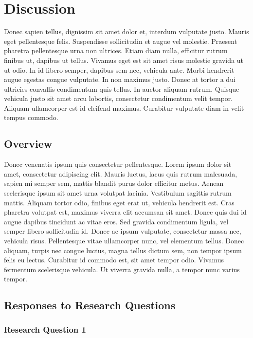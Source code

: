 \section{Discussion}
\label{sec:5}

Donec sapien tellus, dignissim sit amet dolor et, interdum vulputate justo. Mauris eget pellentesque felis. Suspendisse sollicitudin et augue vel molestie. Praesent pharetra pellentesque urna non ultrices. Etiam diam nulla, efficitur rutrum finibus ut, dapibus ut tellus. Vivamus eget est sit amet risus molestie gravida ut ut odio. In id libero semper, dapibus sem nec, vehicula ante. Morbi hendrerit augue egestas congue vulputate. In non maximus justo. Donec at tortor a dui ultricies convallis condimentum quis tellus. In auctor aliquam rutrum. Quisque vehicula justo sit amet arcu lobortis, consectetur condimentum velit tempor. Aliquam ullamcorper est id eleifend maximus. Curabitur vulputate diam in velit tempus commodo.

\subsection{Overview}

Donec venenatis ipsum quis consectetur pellentesque. Lorem ipsum dolor sit amet, consectetur adipiscing elit. Mauris luctus, lacus quis rutrum malesuada, sapien mi semper sem, mattis blandit purus dolor efficitur metus. Aenean scelerisque ipsum sit amet urna volutpat lacinia. Vestibulum sagittis rutrum mattis. Aliquam tortor odio, finibus eget erat ut, vehicula hendrerit est. Cras pharetra volutpat est, maximus viverra elit accumsan sit amet. Donec quis dui id augue dapibus tincidunt ac vitae eros. Sed gravida condimentum ligula, vel semper libero sollicitudin id. Donec ac ipsum vulputate, consectetur massa nec, vehicula risus. Pellentesque vitae ullamcorper nunc, vel elementum tellus. Donec aliquam, turpis nec congue luctus, magna tellus dictum sem, non tempor ipsum felis eu lectus. Curabitur id commodo est, sit amet tempor odio. Vivamus fermentum scelerisque vehicula. Ut viverra gravida nulla, a tempor nunc varius tempor.

\subsection{Responses to Research Questions}

\subsubsection{Research Question 1}

